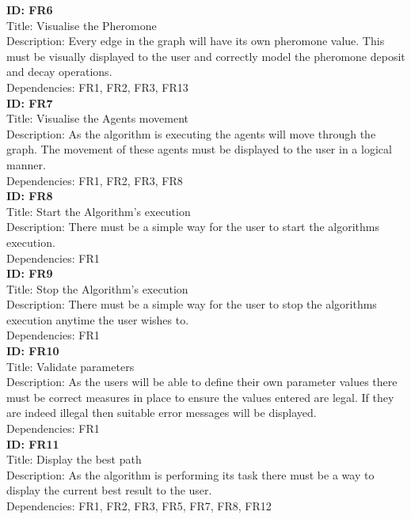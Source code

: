 \noindent
\textbf{ID: FR6}\\
Title: Visualise the Pheromone\\
Description: Every edge in the graph will have its own pheromone value. This must be visually displayed to the user and correctly model the pheromone deposit and decay operations.\\
Dependencies: FR1, FR2, FR3, FR13
\\

\noindent
\textbf{ID: FR7}\\
Title: Visualise the Agents movement\\
Description: As the algorithm is executing the agents will move through the graph. The movement of these agents must be displayed to the user in a logical manner.\\
Dependencies: FR1, FR2, FR3, FR8
\\

\noindent
\textbf{ID: FR8}\\
Title: Start the Algorithm's execution\\
Description: There must be a simple way for the user to start the algorithms execution. \\
Dependencies: FR1
\\

\noindent
\textbf{ID: FR9}\\
Title: Stop the Algorithm's execution\\
Description: There must be a simple way for the user to stop the algorithms execution anytime the user wishes to. \\
Dependencies: FR1
\\

\noindent
\textbf{ID: FR10}\\
Title: Validate parameters\\
Description: As the users will be able to define their own parameter values there must be correct measures in place to ensure the values entered are legal. If they are indeed illegal then suitable error messages will be displayed. \\
Dependencies: FR1
\\

\noindent
\textbf{ID: FR11}\\
Title: Display the best path\\
Description: As the algorithm is performing its task there must be a way to display the current best result to the user. \\
Dependencies: FR1, FR2, FR3, FR5, FR7, FR8, FR12
\\

